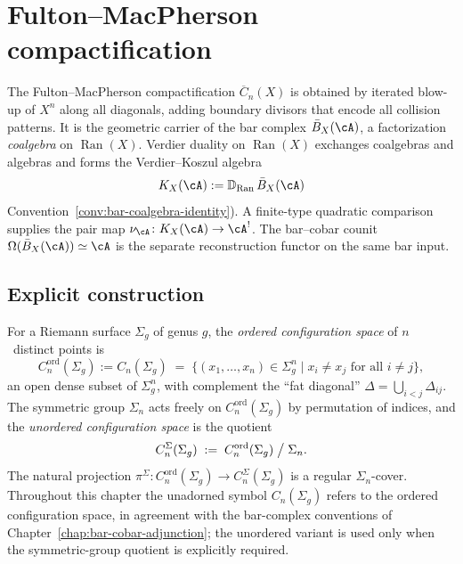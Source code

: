 \section{Fulton--MacPherson compactification}
\label{sec:FM-compactification}

The Fulton--MacPherson compactification $\overline{C}_n(X)$ is obtained
by iterated blow-up of $X^n$ along all diagonals, adding boundary
divisors that encode all collision patterns. It is the geometric
carrier of the bar complex $\bar{B}_X(\cA)$, a factorization
\emph{coalgebra} on $\operatorname{Ran}(X)$. Verdier duality on
$\operatorname{Ran}(X)$ exchanges coalgebras and algebras and forms
the Verdier--Koszul algebra
\[
K_X(\cA)
:=\mathbb{D}_{\operatorname{Ran}}\, \bar{B}_X(\cA)
\]
Convention~\textup{\ref{conv:bar-coalgebra-identity}}).  A
finite-type quadratic comparison supplies the pair map
\(\nu_\cA\colon K_X(\cA)\to\cA^!\).  The bar--cobar counit
$\Omega(\bar{B}_X(\cA)) \simeq \cA$ is the separate reconstruction
functor on the same bar input.

\subsection{Explicit construction}

\begin{definition}\label{def:config-space-genus-g}
For a Riemann surface $\Sigma_g$ of genus $g$, the
\emph{ordered configuration space} of $n$~distinct points is
\[
C^{\mathrm{ord}}_n(\Sigma_g) := C_n(\Sigma_g)
\;=\;\{(x_1, \ldots, x_n) \in \Sigma_g^n \mid x_i \neq x_j \text{ for all } i \neq j\},
\]
an open dense subset of $\Sigma_g^n$, with complement the ``fat diagonal''
$\Delta = \bigcup_{i<j} \Delta_{ij}$. The symmetric group $\Sigma_n$ acts
freely on $C^{\mathrm{ord}}_n(\Sigma_g)$ by permutation of indices, and
the \emph{unordered configuration space} is the quotient
\[
C^{\Sigma}_n(\Sigma_g)
\;:=\;
C^{\mathrm{ord}}_n(\Sigma_g)\bigm/ \Sigma_n.
\]
The natural projection
$\pi^\Sigma\colon C^{\mathrm{ord}}_n(\Sigma_g) \to C^{\Sigma}_n(\Sigma_g)$
is a regular $\Sigma_n$-cover. Throughout this chapter the unadorned
symbol $C_n(\Sigma_g)$ refers to the ordered configuration space, in
agreement with the bar-complex conventions of
Chapter~\ref{chap:bar-cobar-adjunction}; the unordered variant is used
only when the symmetric-group quotient is explicitly required.
\end{definition}

